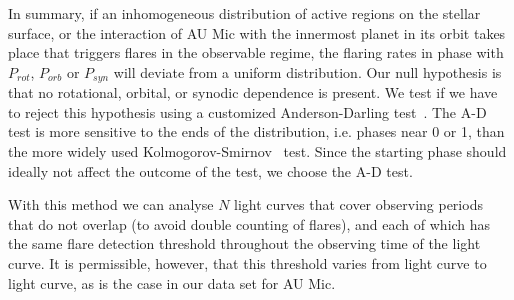 \documentclass[fleqn,usenatbib]{mnras}%
\begin{document}
In summary, if an inhomogeneous distribution of active regions on the stellar surface, or the interaction of AU Mic with the innermost planet in its orbit takes place that triggers flares in the observable regime, the flaring rates in phase with $P_{rot}$, $P_{orb}$ or $P_{syn}$  will deviate from a uniform distribution. Our null hypothesis is that no rotational, orbital, or synodic dependence is present. We test if we have to reject this hypothesis using a customized Anderson-Darling test~\citep[\mbox{A-D} test,][]{anderson1952, stephens1974edf}. The \mbox{A-D} test is more sensitive to the ends of the distribution, i.e. phases near 0 or 1, than the more widely used Kolmogorov-Smirnov~\citep{kolmogorov1933sulla,smirnov1948table} test. Since the starting phase should ideally not affect the outcome of the test, we choose the \mbox{A-D} test.

With this method we can analyse $N$ light curves that cover observing periods that do not overlap (to avoid double counting of flares), and each of which has the same flare detection threshold throughout the observing time of the light curve. It is permissible, however, that this threshold varies from light curve to light curve, as is the case in our data set for AU Mic.
 
\end{document}
